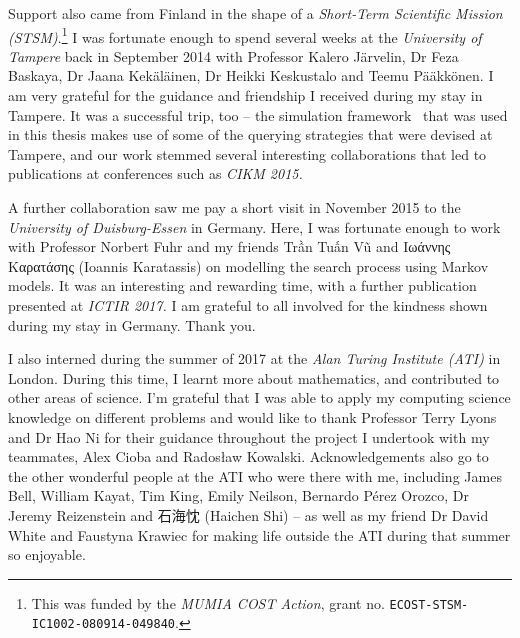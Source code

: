 \begin{preamble}
Support also came from Finland in the shape of a \emph{Short-Term Scientific Mission (STSM)}.\footnote{This was funded by the \emph{MUMIA COST Action}, grant no. \texttt{ECOST-STSM-IC1002-080914-049840}.} I was fortunate enough to spend several weeks at the \emph{University of Tampere} back in September 2014 with Professor Kalero J\"{a}rvelin, Dr Feza Baskaya, Dr Jaana Kek\"{a}l\"{a}inen, Dr Heikki Keskustalo and Teemu P\"{a}\"{a}kk\"{o}nen. I am very grateful for the guidance and friendship I received during my stay in Tampere. It was a successful trip, too -- the simulation framework \simiir~that was used in this thesis makes use of some of the querying strategies that were devised at Tampere, and our work stemmed several interesting collaborations that led to publications at conferences such as \emph{CIKM 2015.}

A further collaboration saw me pay a short visit in November 2015 to the \emph{University of Duisburg-Essen} in Germany. Here, I was fortunate enough to work with Professor Norbert Fuhr and my friends Trần Tuấn Vũ and Ιωάννης Καρατάσης (Ioannis Karatassis) on modelling the search process using Markov models. It was an interesting and rewarding time, with a further publication presented at \emph{ICTIR 2017.} I am grateful to all involved for the kindness shown during my stay in Germany. Thank you.

I also interned during the summer of 2017 at the \emph{Alan Turing Institute (ATI)} in London. During this time, I learnt more about mathematics, and contributed to other areas of science. I'm grateful that I was able to apply my computing science knowledge on different problems and would like to thank Professor Terry Lyons and Dr Hao Ni for their guidance throughout the project I undertook with my teammates, Alex Cioba and Rados\l{}aw Kowalski. Acknowledgements also go to the other wonderful people at the ATI who were there with me, including James Bell, William Kayat, Tim King, Emily Neilson, Bernardo P\'{e}rez Orozco, Dr Jeremy Reizenstein and {\asianfont 石海忱} (Haichen Shi) -- as well as my friend Dr David White and Faustyna Krawiec for making life outside the ATI during that summer so enjoyable.


\end{preamble}
